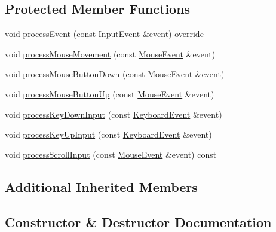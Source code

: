 \subsection*{Protected Member Functions}
\begin{DoxyCompactItemize}
\item 
void \mbox{\hyperlink{classec_1_1_camera_controller_af44aad5f80005eaadf5d637b3b00c6d6}{process\+Event}} (const \mbox{\hyperlink{structec_1_1_input_event}{Input\+Event}} \&event) override
\item 
void \mbox{\hyperlink{classec_1_1_camera_controller_a9dc1490128a5946521a4111938564b42}{process\+Mouse\+Movement}} (const \mbox{\hyperlink{structec_1_1_mouse_event}{Mouse\+Event}} \&event)
\item 
void \mbox{\hyperlink{classec_1_1_camera_controller_ac2d7bd60346a2f23f591b9b5c05550dc}{process\+Mouse\+Button\+Down}} (const \mbox{\hyperlink{structec_1_1_mouse_event}{Mouse\+Event}} \&event)
\item 
void \mbox{\hyperlink{classec_1_1_camera_controller_af2a0f763157a655d53538ac9644620dd}{process\+Mouse\+Button\+Up}} (const \mbox{\hyperlink{structec_1_1_mouse_event}{Mouse\+Event}} \&event)
\item 
void \mbox{\hyperlink{classec_1_1_camera_controller_af1e6f226b4af2aa815bd885f71d25c12}{process\+Key\+Down\+Input}} (const \mbox{\hyperlink{structec_1_1_keyboard_event}{Keyboard\+Event}} \&event)
\item 
void \mbox{\hyperlink{classec_1_1_camera_controller_ac92bb03a95ddf600b4a08b5b043b601e}{process\+Key\+Up\+Input}} (const \mbox{\hyperlink{structec_1_1_keyboard_event}{Keyboard\+Event}} \&event)
\item 
void \mbox{\hyperlink{classec_1_1_camera_controller_aa2f60cde89ba3e982eef28d505927c22}{process\+Scroll\+Input}} (const \mbox{\hyperlink{structec_1_1_mouse_event}{Mouse\+Event}} \&event) const
\end{DoxyCompactItemize}
\subsection*{Additional Inherited Members}


\subsection{Constructor \& Destructor Documentation}
\mbox{\label{classec_1_1_camera_controller_a53fd061c49374fd8f1194cecac1e35aa}} 
